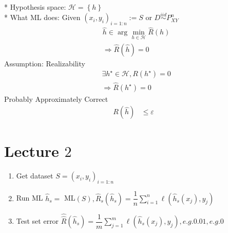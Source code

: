 \documentclass{article}
\begin{document}
\\* Hypothesis space: $\mathcal{H} = \left\{h\right\}$
\\* What ML does: Given $\left(x_{i}, y_{i}\right)_{i = 1:n} := S $ or $D  \stackrel{iid}{\sim} P_{X Y}^{n}$
\begin{align*}
&  \hat{h} \in \arg\displaystyle\min_{h \in \mathcal{H}} \hat{R}\left(h\right)
\\ &\Rightarrow  \hat{R}\left(\hat{h}\right) = 0
\end{align*}
Assumption: Realizability
\begin{align*}
&  \exists h^\star  \in \mathcal{H}, R\left(h^\star \right) = 0
\\ &\Rightarrow  \hat{R}\left(h^\star \right) = 0
\end{align*}
Probably Approximately Correct
\begin{align*}
R\left(\hat{h}\right)  &\leq  \varepsilon
\end{align*}



\section{Lecture $2$} 
\begin{enumerate}
\item Get dataset $S  = \left(x_{i}, y_{i}\right)_{i = 1:n}$
\item Run ML $\hat{h}_{s} =$ ML$\left(S \right), \hat{R}_{s}\left(\hat{h}_{s}\right) = \dfrac{1}{n} \displaystyle\sum_{i=1}^{n} \ell\left(\hat{h}_{s}\left(x_{j}\right), y_{j}\right)$
\item Test set error $\hat{\hat{R}}\left(\hat{h}_{s}\right) = \dfrac{1}{m} \displaystyle\sum_{j=1}^{m} \ell\left(\hat{h}_{s}\left(x_{j}\right), y_{j}\right), e.g. 0.01, e.g. 0$
\end{enumerate}
\end{document}
